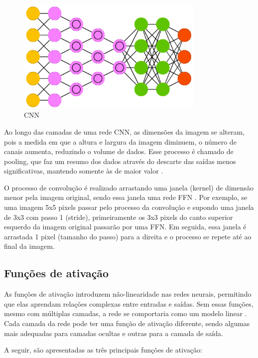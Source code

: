 \begin{figure}[H]
    \centering
    \caption{\label{fig:cnn}CNN}
    \includegraphics[width=0.8\textwidth]{img/revisao_bibliografica/cnn.png}
\end{figure}

Ao longo das camadas de uma rede CNN, as dimensões da imagem se alteram, pois a medida em que a altura e largura da imagem diminuem, o número de canais aumenta, reduzindo o volume de dados. Esse processo é chamado de pooling, que faz um resumo dos dados através do descarte das saídas menos significativas, mantendo somente às de maior valor \cite{veen2016}.

O processo de convolução é realizado arrastando uma janela (kernel) de dimensão menor pela imagem original, sendo essa janela uma rede FFN \cite{veen2016}. Por exemplo, se uma imagem 5x5 pixels passar pelo processo da convolução e supondo uma janela de 3x3 com passo 1 (stride), primeiramente os 3x3 pixels do canto superior esquerdo da imagem original passarão por uma FFN. Em seguida, essa janela é arrastada 1 pixel (tamanho do passo) para a direita e o processo se repete até ao final da imagem.

\subsection{Funções de ativação}

As funções de ativação introduzem não-linearidade nas redes neurais, permitindo que elas aprendam relações complexas entre entradas e saídas. Sem essas funções, mesmo com múltiplas camadas, a rede se comportaria como um modelo linear \cite{badiger2022retrospective}. Cada camada da rede pode ter uma função de ativação diferente, sendo algumas mais adequadas para camadas ocultas e outras para a camada de saída.

A seguir, são apresentadas as três principais funções de ativação:

